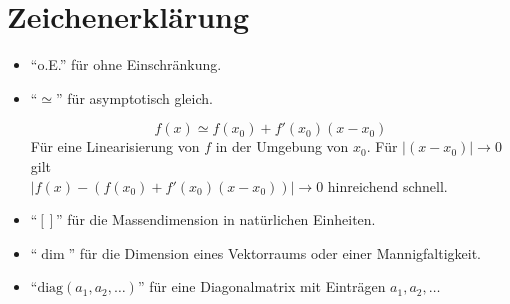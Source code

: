 \clearpage
\section*{Zeichenerklärung}

\begin{itemize}
\item "`o.E."' für ohne Einschränkung.

\item "`$\simeq$"' für asymptotisch gleich.
	\begin{beispiel}
	 \begin{equation}
	  f(x)\simeq f(x_0)+f'(x_0)(x-x_0)
	 \end{equation}
	  Für eine Linearisierung von $f$ in der Umgebung von $x_0$. Für 
	  $
	  \left|(x-x_0)\right|\rightarrow 0
	  $
	  gilt \\ 
	  $
	  \left|f(x)-\left(f(x_0)+f'(x_0)(x-x_0)\right)\right|\rightarrow 0 
	  $
	  hinreichend schnell.
	\end{beispiel}

  \item "`$[]$"' für die Massendimension in natürlichen Einheiten.
  
  \item "`$\dim$"' für die Dimension eines Vektorraums oder einer Mannigfaltigkeit.
	
	
  \item "`$\text{diag}(a_1,a_2,\ldots)$"' für eine Diagonalmatrix mit Einträgen $a_1,a_2,\ldots$
% 
	
	

      
 
 
\end{itemize}
